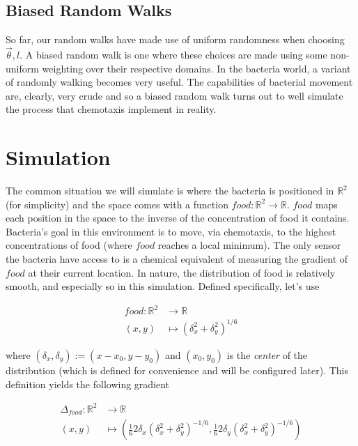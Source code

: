 \documentclass{article}
\begin{document}
\subsection{Biased Random Walks}


  So far, our random walks have made use of uniform randomness when choosing $  \vec{\theta}, l  $. A biased random walk is one where these choices are made using some non-uniform weighting over their respective domains. In the bacteria world, a variant of randomly walking becomes very useful. The capabilities of bacterial movement are, clearly, very crude and so a biased random walk turns out to well simulate the process that chemotaxis implement in reality.


\section{Simulation}


  The common situation we will simulate is where the bacteria is positioned in $  \mathbb{R}^2  $ (for simplicity) and the space comes with a function $  food: \mathbb{R}^2 \rightarrow \mathbb{R}  $. $  food  $ maps each position in the space to the inverse of the concentration of food it contains. Bacteria's goal in this environment is to move, via chemotaxis, to the highest concentrations of food (where $  food  $ reaches a local minimum). The only sensor the bacteria have access to is a chemical equivalent of measuring the gradient of $  food  $ at their current location. In nature, the distribution of food is relatively smooth, and especially so in this simulation. Defined specifically, let's use


\begin{align*} 
  food:
  \mathbb{R}^2 &\rightarrow \mathbb{R} \\
  (x,y) &\mapsto (\delta_x^2 + \delta_y^2)^{1/6}
 \end{align*} \vspace*{0.1cm}


  where $  (\delta_x, \delta_y) := (x - x_0, y - y_0)  $ and $  (x_0, y_0)  $ is the \textit{center} of the distribution (which is defined for convenience and will be configured later). This definition yields the following gradient


\begin{align*} 
  \Delta_{food}:
  \mathbb{R}^2 &\rightarrow \mathbb{R} \\
  (x,y) &\mapsto
    \left(
      \frac{1}{6} 2 \delta_x (\delta_x^2 + \delta_y^2)^{-1/6},
      \frac{1}{6} 2 \delta_y (\delta_x^2 + \delta_y^2)^{-1/6}
    \right)
 \end{align*} \vspace*{0.1cm}
\end{document}
